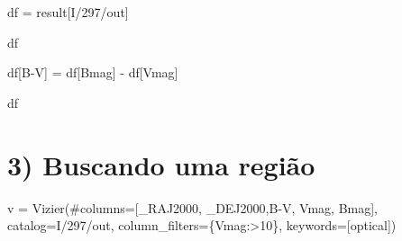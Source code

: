 \documentclass[
  letterpaper,
  DIV=11,
  numbers=noendperiod]{scrreprt}
\newenvironment{Shaded}{\begin{snugshade}}{\end{snugshade}}
\newcommand{\CommentTok}[1]{\textcolor[rgb]{0.37,0.37,0.37}{#1}}
\newcommand{\NormalTok}[1]{\textcolor[rgb]{0.00,0.23,0.31}{#1}}
\newcommand{\OperatorTok}[1]{\textcolor[rgb]{0.37,0.37,0.37}{#1}}
\newcommand{\StringTok}[1]{\textcolor[rgb]{0.13,0.47,0.30}{#1}}
\begin{document}
\begin{Shaded}
\begin{Highlighting}[]
\NormalTok{df }\OperatorTok{=}\NormalTok{ result[}\StringTok{\textquotesingle{}I/297/out\textquotesingle{}}\NormalTok{]}
\end{Highlighting}
\end{Shaded}

\begin{Shaded}
\begin{Highlighting}[]
\NormalTok{df}
\end{Highlighting}
\end{Shaded}

\begin{Shaded}
\begin{Highlighting}[]
\NormalTok{df[}\StringTok{\textquotesingle{}B{-}V\textquotesingle{}}\NormalTok{] }\OperatorTok{=}\NormalTok{ df[}\StringTok{\textquotesingle{}Bmag\textquotesingle{}}\NormalTok{] }\OperatorTok{{-}}\NormalTok{ df[}\StringTok{\textquotesingle{}Vmag\textquotesingle{}}\NormalTok{]}
\end{Highlighting}
\end{Shaded}

\begin{Shaded}
\begin{Highlighting}[]
\NormalTok{df}
\end{Highlighting}
\end{Shaded}

\section{3) Buscando uma região}\label{buscando-uma-regiuxe3o}

\begin{Shaded}
\begin{Highlighting}[]
\NormalTok{v }\OperatorTok{=}\NormalTok{ Vizier(}\CommentTok{\#columns=[\textquotesingle{}\_RAJ2000\textquotesingle{}, \textquotesingle{}\_DEJ2000\textquotesingle{},\textquotesingle{}B{-}V\textquotesingle{}, \textquotesingle{}Vmag\textquotesingle{}, \textquotesingle{}Bmag\textquotesingle{}], }
\NormalTok{           catalog}\OperatorTok{=}\StringTok{\textquotesingle{}I/297/out\textquotesingle{}}\NormalTok{,}
\NormalTok{           column\_filters}\OperatorTok{=}\NormalTok{\{}\StringTok{\textquotesingle{}Vmag\textquotesingle{}}\NormalTok{:}\StringTok{\textquotesingle{}\textgreater{}10\textquotesingle{}}\NormalTok{\}, keywords}\OperatorTok{=}\NormalTok{[}\StringTok{\textquotesingle{}optical\textquotesingle{}}\NormalTok{])}
\end{Highlighting}
\end{Shaded}
\end{document}
